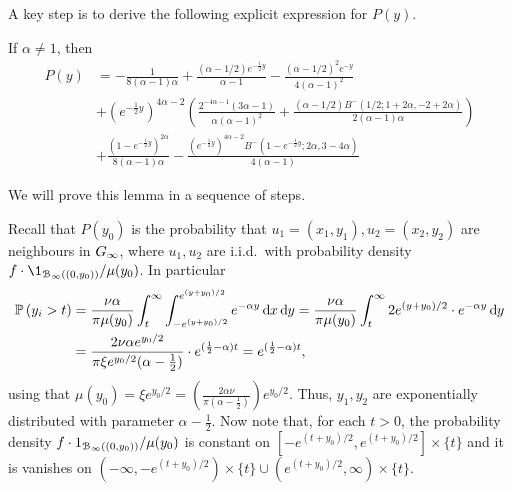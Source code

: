 A key step is to derive the following explicit expression for $P(y)$.

\begin{lemma}\label{lem:Paneq1}
	If $\alpha \not = 1$, then
	\begin{align*}
	 P(y) &=-\frac{1}{8 (\alpha - 1) \alpha} + \frac{(\alpha - 1/2) e^{-\frac{1}{2}y}}{\alpha - 1} - \frac{(\alpha - 1/2)^2 e^{-y}}{
		4 (\alpha - 1)^2} \\
	&+ 
	(e^{-\frac{1}{2}y})^{4\alpha -2} \left(\frac{2^{-4 \alpha-1} (3 \alpha - 1)}{\alpha (\alpha - 1)^2} 
		+ \frac{(\alpha - 1/2 ) B^-(1/2; 1 + 2 \alpha, -2 + 2 \alpha)}{2(\alpha - 1) \alpha} \right) \\
	&+ \frac{(1 - 
		e^{-\frac{1}{2}y})^{2 \alpha}}{8 (\alpha - 1) \alpha} - \frac{  
		(e^{-\frac{1}{2}y})^{4 \alpha - 2} B^-(1 - e^{-\frac{1}{2}y}; 2 \alpha, 3 - 4 \alpha)}{4 (\alpha - 1)}
	\end{align*}
\end{lemma}


We will prove this lemma in a sequence of steps.

Recall that $P(y_0)$ is the probability that $u_1 = (x_1,y_1), u_2 = (x_2,y_2)$ are neighbours in $G_{\infty}$, where
$u_1, u_2$ are i.i.d.~with probability density $f \cdot \1_{\BallPo{(0,y_0)}} / \mu(y_0)$.
In particular
\begin{align*}
	\mathbb{P}\left(y_i > t\right) &= \frac{\nu\alpha}{\pi \mu(y_0)} \int_t^\infty \int_{-e^{(y+y_0)/2}}^{e^{(y+y_0)/2}} e^{-\alpha y}
		\operatorname{\mathrm{d}\hspace{-2pt}} x \operatorname{\mathrm{d}\hspace{-2pt}} y
		= \frac{\nu\alpha}{\pi \mu(y_0)} \int_t^\infty 2 e^{(y+y_0)/2} \cdot e^{-\alpha y} \operatorname{\mathrm{d}\hspace{-2pt}} y \\
	&= \frac{2 \nu\alpha e^{y_0/2} }{\pi \xi e^{y_0/2} (\alpha-\frac{1}{2}) }  \cdot e^{(\frac{1}{2}-\alpha)t}
		= e^{(\frac{1}{2}-\alpha)t},
\end{align*}
using that $\mu(y_0) = \xi e^{y_0/2} = \left(\frac{2\alpha\nu}{\pi(\alpha-\frac12)}\right) e^{y_0/2}$.
Thus, $y_1, y_2$ are exponentially distributed with parameter $\alpha-\frac12$.
Now note that, for each $t>0$, the probability density $f \cdot 1_{{\mathcal B}_{\infty}\left((0,y_0)\right)} / \mu(y_0)$
is constant on $[-e^{(t+y_0)/2}, e^{(t+y_0)/2}] \times \{t\}$ and it is 
vanishes on $(-\infty, -e^{(t+y_0)/2}) \times \{t\} \cup (e^{(t+y_0)/2},\infty)\times\{t\}$.

